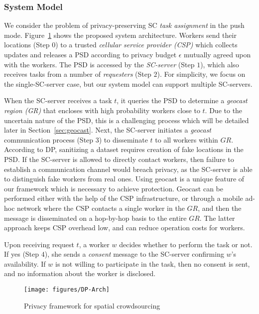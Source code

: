 \documentclass{USC-Thesis}
\numberwithin{equation}{chapter}
\begin{document}
\subsubsection{System Model}
\label{sec:system1}
We consider the problem of privacy-preserving SC {\em task assignment} in the push mode. Figure~\ref{fig:framework} shows the proposed system architecture. Workers send their locations (Step $0$) to a trusted {\em cellular service provider (CSP)} which collects updates and releases a PSD according to privacy budget $\epsilon$ mutually agreed upon with the workers. The PSD is accessed by the {\em SC-server} (Step $1$), which also receives tasks from a number of {\em requesters} (Step $2$). For simplicity, we focus on the single-SC-server case, but our system model can support multiple SC-servers.

When the SC-server receives a task $t$, it queries the PSD to determine a {\em geocast region (GR)} that encloses with high probability workers close to $t$. Due to the uncertain nature of the PSD, this is a challenging process which will be detailed later in Section~\ref{sec:geocast}. Next, the SC-server initiates a {\em geocast} communication \cite{navas1997geocast} process (Step $3$) to disseminate $t$ to all workers within $\mathit{GR}$. According to DP, sanitizing a dataset requires creation of fake locations in the PSD. If the SC-server is allowed to directly contact workers, then failure to establish a communication channel would breach privacy, as the SC-server is able to distinguish fake workers from real ones. Using geocast is a unique feature of our framework which is necessary to achieve protection. Geocast can be performed either with the help of the CSP infrastructure, or through a mobile ad-hoc network where the CSP contacts a single worker in the $\mathit{GR}$, and then the message is disseminated on a hop-by-hop basis to the entire $\mathit{GR}$. The latter approach keeps CSP overhead low, and can reduce operation costs for workers.  

Upon receiving request $t$, a worker $w$ decides whether to perform the task or not. If yes (Step $4$), she sends a {\em consent} message to the SC-server confirming $w$'s availability.
If $w$ is not willing to participate in the task, then no consent is sent, and no information about the worker is disclosed.

\begin{figure}[!htb]\centering
  \texttt{[image: figures/DP-Arch]}
  \caption{Privacy framework for spatial crowdsourcing}
  \label{fig:framework}
\end{figure}
\end{document}
